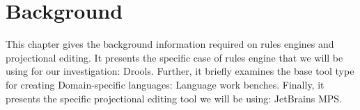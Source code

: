 \chapter{Background}\label{chapter:Background}

This chapter gives the background information required on rules engines and projectional editing.
It presents the specific case of rules engine that we will be using for our investigation: Drools.
Further, it briefly examines the base tool type for creating Domain-specific languages: Language work benches.
Finally, it presents the specific projectional editing tool we will be using: JetBrains MPS.



